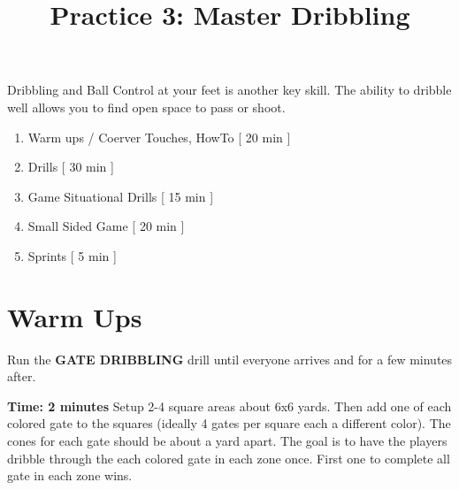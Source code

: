 \documentclass[10pt,letterpaper]{article}
\title{\vspace{-.5in}Practice 3: Master Dribbling}
\author{\vspace{-.5in}}
\date{\vspace{-.5in}}
\newenvironment{agendablock}[1]{%
    \tcolorbox[beamer,%
    noparskip,breakable,
    colback=LightGray,colframe=Black,%
    colbacklower=Gray!75!LightGray,%
    title=#1]}%
    {\endtcolorbox}
\newenvironment{oddBlock}[1]{%
    \tcolorbox[beamer,%
    noparskip,breakable,
    colback=LightBlue,colframe=DarkBlue,%
    colbacklower=DarkBlue!75!LightBlue,%
    title=#1]}%
    {\endtcolorbox}
\begin{document}
\selectfont

\maketitle

\begin{agendablock}{Practice Activities}
    Dribbling and Ball Control at your feet is another key skill.  The ability to dribble well allows you to find open space to pass or shoot. 
    \begin{enumerate}
        \item Warm ups / Coerver Touches, HowTo [ 20 min ]
        \item Drills [ 30 min ]
        \item Game Situational Drills [ 15 min ]
        \item Small Sided Game [ 20 min ]
        \item Sprints [ 5 min ]
    \end{enumerate}
\end{agendablock}

\section{Warm Ups}
Run the \textbf{GATE DRIBBLING} drill until everyone arrives and for a few minutes after.

\textbf{Time: 2 minutes}
\begin{oddBlock}{Gate Dribbling}
Setup 2-4 square areas about 6x6 yards.  Then add one of each colored gate to the squares (ideally 4 gates per square each a different color).  The cones for each gate should be about a yard apart.  The goal is to have the players dribble through the each colored gate in each zone once.  First one to complete all gate in each zone wins.
\end{oddBlock}
\end{document}
